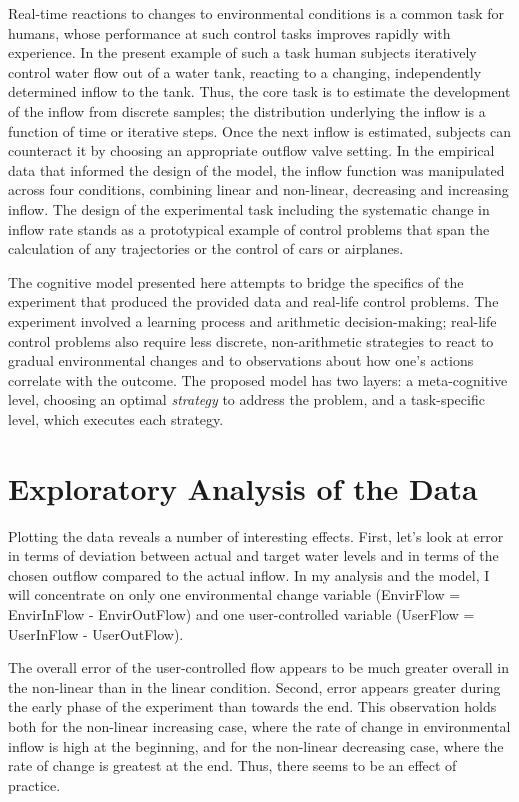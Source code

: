 \documentclass[twocolumn]{article}
\begin{document}
Real-time reactions to changes to environmental conditions is a common task for humans, whose performance at such control tasks improves rapidly with experience.  In the present example of such a task human subjects iteratively control water flow out of a water tank, reacting to a changing, independently determined inflow to the tank.  Thus, the core task is to estimate the development of the inflow from discrete samples; the distribution underlying the inflow is a function of time or iterative steps.  Once the next inflow is estimated, subjects can counteract it by choosing an appropriate outflow valve setting.   In the empirical data that informed the design of the model, the inflow function was manipulated across four conditions, combining linear and non-linear, decreasing and increasing inflow.  The design of the experimental task including the systematic change in inflow rate stands as a prototypical example of control problems that span the calculation of any trajectories or the control of cars or airplanes.

The cognitive model presented here attempts to bridge the specifics of the experiment that produced the provided data and real-life control problems.  The experiment involved a learning process and arithmetic decision-making; real-life control problems also require less discrete, non-arithmetic strategies to react to gradual environmental changes and to observations about how one's actions correlate with the outcome.  The proposed model has two layers: a meta-cognitive level, choosing an optimal \emph{strategy} to address the problem, and a task-specific level, which executes each strategy.


\section{Exploratory Analysis of the Data}
\label{sec:expl-analys-data}


Plotting the data reveals a number of interesting effects.  First, let's look at error in terms of deviation between actual and target water levels and in terms of the chosen outflow compared to the actual inflow.  In my analysis and the model, I will concentrate on only one environmental change variable (EnvirFlow = EnvirInFlow - EnvirOutFlow) and one user-controlled variable (UserFlow = UserInFlow - UserOutFlow).  

The overall error of the user-controlled flow appears to be much greater overall in the non-linear than in the linear condition.  Second, error appears greater during the early phase of the experiment than towards the end.  This observation holds both for the non-linear increasing case, where the rate of change in environmental inflow is high at the beginning, and for the non-linear decreasing case, where the rate of change is greatest at the end.  Thus, there seems to be an effect of practice.
\end{document}
